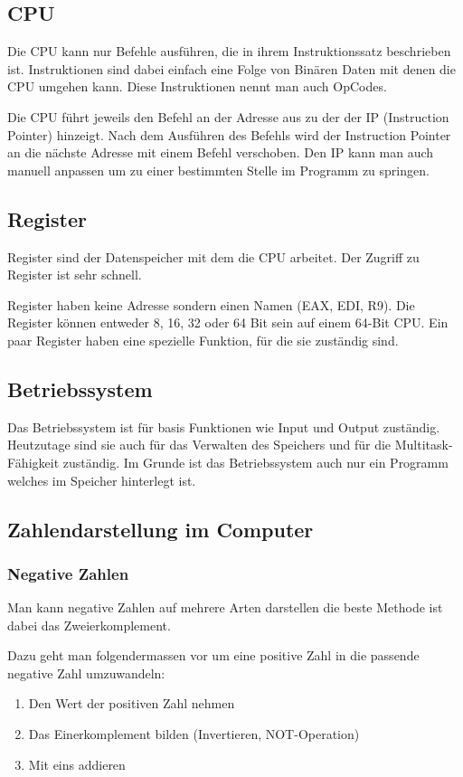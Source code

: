 \documentclass[12pt, a4paper, oneside]{article}
\begin{document}
\subsection{CPU} 
Die CPU kann nur Befehle ausführen, die in ihrem Instruktionssatz beschrieben ist. Instruktionen sind dabei einfach eine Folge von Binären Daten mit denen die CPU umgehen kann. Diese Instruktionen nennt man auch OpCodes.

Die CPU führt jeweils den Befehl an der Adresse aus zu der der IP (Instruction Pointer) hinzeigt. Nach dem Ausführen des Befehls wird der Instruction Pointer an die nächste Adresse mit einem Befehl verschoben. Den IP kann man auch manuell anpassen um zu einer bestimmten Stelle im Programm zu springen.

\subsection{Register}
Register sind der Datenspeicher mit dem die CPU arbeitet. Der Zugriff zu Register ist sehr schnell.

Register haben keine Adresse sondern einen Namen (EAX, EDI, R9). Die Register können entweder 8, 16, 32 oder 64 Bit sein auf einem 64-Bit CPU. Ein paar Register haben eine spezielle Funktion, für die sie zuständig sind.

\subsection{Betriebssystem}
Das Betriebssystem ist für basis Funktionen wie Input und Output zuständig. Heutzutage sind sie auch für das Verwalten des Speichers und für die Multitask-Fähigkeit zuständig. Im Grunde ist das Betriebssystem auch nur ein Programm welches im Speicher hinterlegt ist.

\subsection{Zahlendarstellung im Computer}
\subsubsection{Negative Zahlen}
Man kann negative Zahlen auf mehrere Arten darstellen die beste Methode ist dabei das Zweierkomplement.

Dazu geht man folgendermassen vor um eine positive Zahl in die passende negative Zahl umzuwandeln:
\begin{enumerate}
  \item Den Wert der positiven Zahl nehmen
  \item Das Einerkomplement bilden (Invertieren, NOT-Operation)
  \item Mit eins addieren
\end{enumerate}
\end{document}

